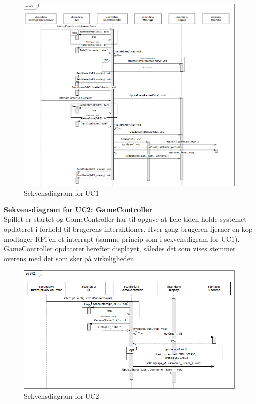\documentclass[Arkitektur/System_main.tex]{subfiles}
\begin{document}
\begin{figure}[H]
    \centering
    \includegraphics[width=\textwidth]{Arkitektur/Softwarearkitektur/Applikationsmodel/RPi/graphics_RPi/UC1_SD.png}
    \caption{Sekvensdiagram for UC1}
    \label{fig:UC1_SD_RPi}
\end{figure}

\textbf{Sekvensdiagram for UC2: GameController}\\
Spillet er startet og GameController har til opgave at hele tiden holde systemet opdateret i forhold til brugerens interaktioner. Hver gang brugeren fjerner en kop modtager RPi'en et interrupt (samme princip som i sekvensdigram for UC1). GameController opdaterer herefter displayet, således det som vises stemmer overens med det som sker på virkeligheden. 

\begin{figure}[H]
    \centering
    \includegraphics[width=\textwidth]{Arkitektur/Softwarearkitektur/Applikationsmodel/RPi/graphics_RPi/UC2_SD.png}
    \caption{Sekvensdiagram for UC2}
    \label{fig:UC2_SD_RPi}
\end{figure}
\end{document}

